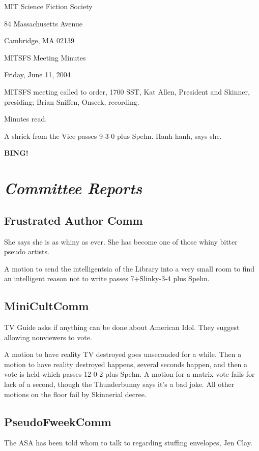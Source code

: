 \documentclass[10pt]{article}
\newcommand{\bing}{{\bf BING!} }
\newcommand{\goto}[1]{\bing \vskip 12pt \section*{{\em{#1}}}}
\newcommand{\ps}{ plus Spehn\xspace}
\begin{document}
\begin{center}

MIT Science Fiction Society 

84 Massachusetts Avenue

Cambridge, MA 02139

\vspace{12pt}

MITSFS Meeting Minutes 

Friday, June 11, 2004

\end{center}
 
\vspace{18pt}

\setlength{\parskip}{6pt}

\noindent
MITSFS meeting called to order, 1700 SST, Kat Allen, President and
Skinner, presiding; Brian Sniffen,  Onseck, recording.

Minutes read.

A shriek from the Vice passes 9-3-0\ps.  Hanh-hanh, says she.

\goto{Committee Reports}
\subsection*{ Frustrated Author Comm}
She says she is as whiny as ever.  She has become one of those whiny
bitter pseudo artists.

A motion to send the intelligentsia of the Library into a very small
room to find an intelligent reason not to write passes
7+Slinky-3-4\ps.

\subsection*{MiniCultComm}
TV Guide asks if anything can be done about American Idol.  They
suggest allowing nonviewers to vote.

A motion to have reality TV destroyed goes unseconded for a while.
Then a motion to have reality destroyed happens, several seconds
happen, and then a vote is held which passes 12-0-2\ps.  A motion for
a matrix vote fails for lack of a second, though the Thunderbunny says
it's a bad joke.  All other motions on the floor fail by Skinnerial
decree.

\subsection*{PseudoFweekComm}
The ASA has been told whom to talk to regarding stuffing envelopes,
Jen Clay.
\end{document}
